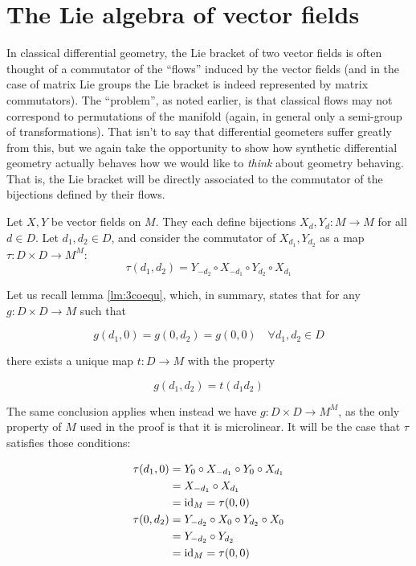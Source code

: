 \section{The Lie algebra of vector fields}

In classical differential geometry, the Lie bracket of two vector fields is often thought of a commutator of the ``flows'' induced by the vector fields (and in the case of matrix Lie groups the Lie bracket is indeed represented by matrix commutators). The ``problem'', as noted earlier, is that classical flows may not correspond to permutations of the manifold (again, in general only a semi-group of transformations). That isn't to say that differential geometers suffer greatly from this, but we again take the opportunity to show how synthetic differential geometry actually behaves how we would like to \emph{think} about geometry behaving. That is, the Lie bracket will be directly associated to the commutator of the bijections defined by their flows.

Let \( X,Y \) be vector fields on \( M \). They each define bijections \( X_d,Y_d:M\to M \) for all \( d\in D \). Let \( d_1,d_2\in D \), and consider the commutator of \( X_{d_1}, Y_{d_2} \) as a map \( \tau:D\times D \to M^M \):
\begin{equation*}
  \tau(d_1,d_2) = Y_{-d_2}\circ X_{-d_1}\circ Y_{d_2}\circ X_{d_1}
\end{equation*}

Let us recall lemma \ref{lm:3coequ}, which, in summary, states that for any \( g:D\times D \to M \) such that

\begin{equation*}
g(d_1,0) = g(0,d_2) = g(0,0) \quad \forall d_1,d_2\in D
\end{equation*}

there exists a unique map \( t:D\to M \) with the property

\begin{equation*}
  g(d_1,d_2) = t(d_1d_2)
\end{equation*}

The same conclusion applies when instead we have \( g:D\times D\to M^M \), as the only property of \( M \) used in the proof is that it is microlinear. It will be the case that \( \tau \) satisfies those conditions:

\begin{align*}
  \tau(d_1,0) &= Y_0\circ X_{-d_1}\circ Y_0\circ X_{d_1} \\
              &= X_{-d_1}\circ X_{d_1}                   \\
	      &= \operatorname{id}_M = \tau(0,0)                       \\
  \tau(0,d_2) &= Y_{-d_2}\circ X_0\circ Y_{d_2}\circ X_0 \\
              &= Y_{-d_2}\circ Y_{d_2}                   \\
	      &= \operatorname{id}_M = \tau(0,0)                       \\
\end{align*}

